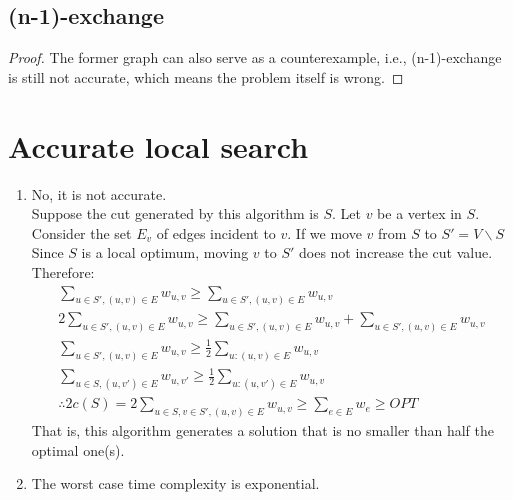 \documentclass[twocolumn, 10.5pt]{article}
\begin{document}
	\subsection*{(n-1)-exchange}
	\begin{proof} 
		The former graph can also serve as a counterexample, i.e., (n-1)-exchange is still not accurate, which means the problem itself is wrong.
	\end{proof}
	\section*{Accurate local search}
	\begin{enumerate}[(1)]
		\item No, it is not accurate.\\
		Suppose the cut generated by this algorithm is $S$. Let $v$ be a vertex in $S$. Consider the set $E_v$ of edges incident to $v$. If we move $v$ from $S$ to $S'=V\backslash S$ Since $S$ is a local optimum, moving $v$ to $S'$ does not increase the cut value. Therefore:
		\[
		\begin{aligned}
			\sum_{u\in S',(u,v)\in E}w_{u,v}\ge \sum_{u\in S',(u,v)\in E}w_{u,v}\\
			2\sum_{u\in S',(u,v)\in E}w_{u,v}\ge \sum_{u\in S',(u,v)\in E}w_{u,v}+\sum_{u\in S',(u,v)\in E}w_{u,v}\\
			\sum_{u\in S',(u,v)\in E}w_{u,v}\ge \frac{1}{2}\sum_{u:(u,v)\in E}w_{u,v}\\
			\sum_{u\in S,(u,v')\in E}w_{u,v'}\ge \frac{1}{2}\sum_{u:(u,v')\in E}w_{u,v}\\
			\therefore 2c(S)=2\sum_{u\in S,v\in S',(u,v)\in E}w_{u,v}\ge \sum_{e\in E}w_e\ge OPT
		\end{aligned}
		\]
		That is, this algorithm generates a solution that is no smaller than half the optimal one(s).
		\item The worst case time complexity is exponential.
	\end{enumerate}
\end{document}
